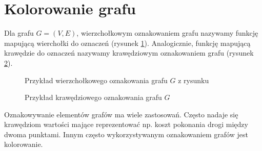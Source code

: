     \section{Kolorowanie grafu}
    \begin{definition}
      Dla grafu $G=(V, E)$, wierzchołkowym oznakowaniem grafu nazywamy funkcję
       mapującą wierchołki do oznaczeń (rysunek \ref{kolor1}). Analogicznie, funkcję mapującą krawędzie do oznaczeń 
       nazywamy krawędziowym oznakowaniem grafu (rysunek \ref{kolor2}).  
    \end{definition}


    \begin{figure}[H]
      \centering
        \caption{ Przykład wierzchołkowego oznakowania grafu $G$ z rysunku }
        \label{kolor1}
     \end{figure}

     \begin{figure}[H]
      \centering
        \caption{ Przykład krawędziowego oznakowania grafu $G$ }
        \label{kolor2}
     \end{figure}

     Oznakowywanie elementów grafów ma wiele zastosowań. Często nadaje się krawędziom wartości mające reprezentować np.
     koszt pokonania drogi między dwoma punktami. Innym często wykorzystywanym oznakowaniem grafów jest kolorowanie.   
   
